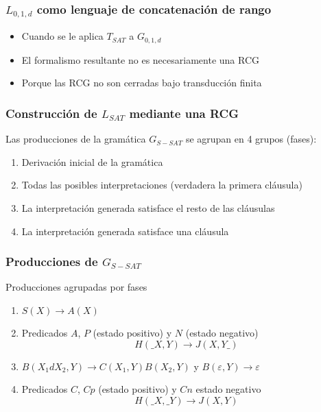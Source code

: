 \documentclass{beamer}
\begin{document}
\begin{frame}
    \frametitle{$L_{0,1,d}$ como lenguaje de concatenación de rango}
    
    \begin{itemize}
        \item Cuando se le aplica $T_{SAT}$ a $G_{0,1,d}$
              \pause
        \item El formalismo resultante no es necesariamente una RCG
              \pause
        \item Porque las RCG no son cerradas bajo transducción finita
    \end{itemize}
\end{frame}

\begin{frame}
    \frametitle{Construcción de $L_{SAT}$ mediante una RCG}
    
    Las producciones de la gramática $G_{S-SAT}$ se agrupan en 4 grupos (fases):
    
    \begin{enumerate}
        \item Derivación inicial de la gramática
              \pause
        \item Todas las posibles interpretaciones (verdadera la primera cláusula)
              \pause
        \item La interpretación generada satisface el resto de las cláusulas
              \pause
        \item La interpretación generada satisface una cláusula
    \end{enumerate}
    
\end{frame}

\begin{frame}
    \frametitle{Producciones de $G_{S-SAT}$}
    
    Producciones agrupadas por fases
    \begin{enumerate}
        \item $S(X)\to A(X)$
              \pause
        \item Predicados $A$, $P$ (estado positivo) y $N$ (estado negativo)
              $$H(\_X,Y)\to J(X,Y\_)$$
              \pause
        \item $B(X_1dX_2,Y)\to C(X_1,Y) B(X_2,Y)$ y $B(\varepsilon,Y)\to\varepsilon$
              \pause
        \item Predicados $C$, $Cp$ (estado positivo) y $Cn$ estado negativo\\
              $$H(\_X,\_Y)\to J(X,Y)$$
              
    \end{enumerate}
    
\end{frame}
\end{document}
